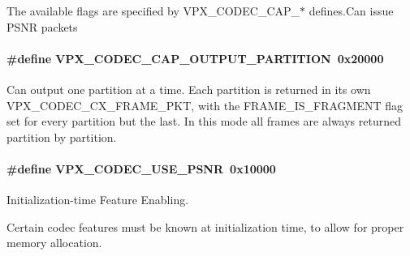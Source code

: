The available flags are specified by V\+P\+X\+\_\+\+C\+O\+D\+E\+C\+\_\+\+C\+A\+P\+\_\+$\ast$ defines.\+Can issue P\+S\+N\+R packets \hypertarget{group__encoder_ga69768adb51faa28d98870cbc77e9ea93}{
\paragraph[{V\+P\+X\+\_\+\+C\+O\+D\+E\+C\+\_\+\+C\+A\+P\+\_\+\+O\+U\+T\+P\+U\+T\+\_\+\+P\+A\+R\+T\+I\+T\+I\+O\+N}]{\setlength{\rightskip}{0pt plus 5cm}\#define V\+P\+X\+\_\+\+C\+O\+D\+E\+C\+\_\+\+C\+A\+P\+\_\+\+O\+U\+T\+P\+U\+T\+\_\+\+P\+A\+R\+T\+I\+T\+I\+O\+N~0x20000}}\label{group__encoder_ga69768adb51faa28d98870cbc77e9ea93}
Can output one partition at a time. Each partition is returned in its own V\+P\+X\+\_\+\+C\+O\+D\+E\+C\+\_\+\+C\+X\+\_\+\+F\+R\+A\+M\+E\+\_\+\+P\+K\+T, with the F\+R\+A\+M\+E\+\_\+\+I\+S\+\_\+\+F\+R\+A\+G\+M\+E\+N\+T flag set for every partition but the last. In this mode all frames are always returned partition by partition. \hypertarget{group__encoder_ga57bb9eb1881c7e4bf86580660a5e40a0}{
\paragraph[{V\+P\+X\+\_\+\+C\+O\+D\+E\+C\+\_\+\+U\+S\+E\+\_\+\+P\+S\+N\+R}]{\setlength{\rightskip}{0pt plus 5cm}\#define V\+P\+X\+\_\+\+C\+O\+D\+E\+C\+\_\+\+U\+S\+E\+\_\+\+P\+S\+N\+R~0x10000}}\label{group__encoder_ga57bb9eb1881c7e4bf86580660a5e40a0}


Initialization-\/time Feature Enabling. 

Certain codec features must be known at initialization time, to allow for proper memory allocation.

